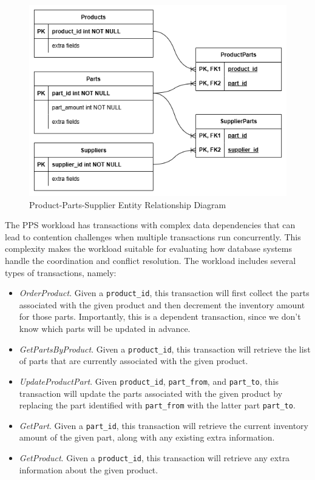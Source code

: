 \begin{figure}[ht]
    \centering
    \includegraphics[width=1\linewidth]{figures/PPS ERD.png}
    \caption{Product-Parts-Supplier Entity Relationship Diagram}
    \label{fig: pps-erd}
\end{figure}

The PPS workload has transactions with complex data dependencies that can lead to contention challenges when multiple transactions run concurrently. This complexity makes the workload suitable for evaluating how database systems handle the coordination and conflict resolution. The workload includes several types of transactions, namely:
\begin{itemize}
    \item \textit{OrderProduct}. Given a \texttt{product\_id}, this transaction will first collect the parts associated with the given product and then decrement the inventory amount for those parts. Importantly, this is a dependent transaction, since we don't know which parts will be updated in advance.
    \item \textit{GetPartsByProduct}. Given a \texttt{product\_id}, this transaction will retrieve the list of parts that are currently associated with the given product.
    \item \textit{UpdateProductPart}. Given \texttt{product\_id}, \texttt{part\_from}, and \texttt{part\_to}, this transaction will update the parts associated with the given product by replacing the part identified with \texttt{part\_from} with the latter part \texttt{part\_to}.
    \item \textit{GetPart}. Given a \texttt{part\_id}, this transaction will retrieve the current inventory amount of the given part, along with any existing extra information.
    \item \textit{GetProduct}. Given a \texttt{product\_id}, this transaction will retrieve any extra information about the given product.
\end{itemize}
